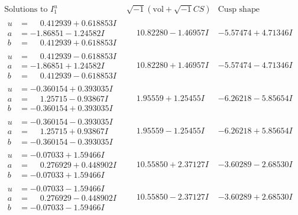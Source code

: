 \documentclass[1p]{elsarticle_modified}
\theoremstyle{definition}
\newcommand{\I}{\sqrt{-1}}
\begin{document}
$$\begin{array}{c|c|c}  
\text{Solutions to }I^u_{1}& \I (\text{vol} + \sqrt{-1}CS) & \text{Cusp shape}\\
 \hline 
\begin{aligned}
u &= \phantom{-}0.412939 + 0.618853 I \\
a &= -1.86851 - 1.24582 I \\
b &= \phantom{-}0.412939 + 0.618853 I\end{aligned}
 & \phantom{-}10.82280 - 1.46957 I & -5.57474 + 4.71346 I \\ \hline\begin{aligned}
u &= \phantom{-}0.412939 - 0.618853 I \\
a &= -1.86851 + 1.24582 I \\
b &= \phantom{-}0.412939 - 0.618853 I\end{aligned}
 & \phantom{-}10.82280 + 1.46957 I & -5.57474 - 4.71346 I \\ \hline\begin{aligned}
u &= -0.360154 + 0.393035 I \\
a &= \phantom{-}1.25715 - 0.93867 I \\
b &= -0.360154 + 0.393035 I\end{aligned}
 & \phantom{-}1.95559 + 1.25455 I & -6.26218 - 5.85654 I \\ \hline\begin{aligned}
u &= -0.360154 - 0.393035 I \\
a &= \phantom{-}1.25715 + 0.93867 I \\
b &= -0.360154 - 0.393035 I\end{aligned}
 & \phantom{-}1.95559 - 1.25455 I & -6.26218 + 5.85654 I \\ \hline\begin{aligned}
u &= -0.07033 + 1.59466 I \\
a &= \phantom{-}0.276929 + 0.448902 I \\
b &= -0.07033 + 1.59466 I\end{aligned}
 & \phantom{-}10.55850 + 2.37127 I & -3.60289 - 2.68530 I \\ \hline\begin{aligned}
u &= -0.07033 - 1.59466 I \\
a &= \phantom{-}0.276929 - 0.448902 I \\
b &= -0.07033 - 1.59466 I\end{aligned}
 & \phantom{-}10.55850 - 2.37127 I & -3.60289 + 2.68530 I \\ \hline\begin{aligned}

\end{aligned}
\end{array}$$
\end{document}
